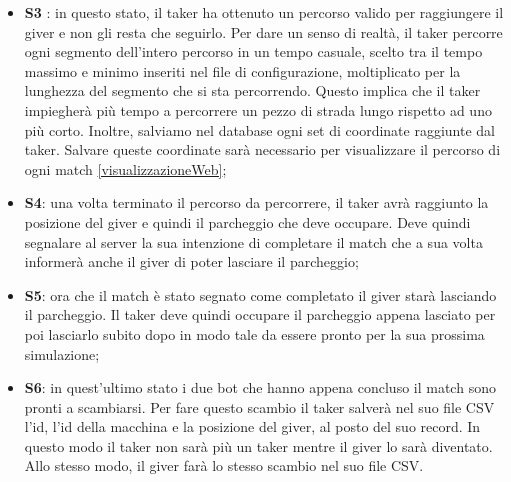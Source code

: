 \documentclass[main.tex]{subfiles}
\begin{document}
\begin{itemize}
    \item \textbf{S3} \label{follow-path}: in questo stato, il taker ha ottenuto un percorso valido per raggiungere il giver e non gli resta che seguirlo. Per dare un senso di realtà, il taker percorre ogni segmento dell'intero percorso in un tempo casuale, scelto tra il tempo massimo e minimo inseriti nel file di configurazione, moltiplicato per la lunghezza del segmento che si sta percorrendo. Questo implica che il taker impiegherà più tempo a percorrere un pezzo di strada lungo rispetto ad uno più corto.\newline
    Inoltre, salviamo nel database ogni set di coordinate raggiunte dal taker. Salvare queste coordinate sarà necessario per visualizzare il percorso di ogni match \ref{visualizzazioneWeb};
    
    


    \item \textbf{S4}: una volta terminato il percorso da percorrere, il taker avrà raggiunto la posizione del giver e quindi il parcheggio che deve occupare. Deve quindi segnalare al server la sua intenzione di completare il match che a sua volta informerà anche il giver di poter lasciare il parcheggio;

    

    \item \textbf{S5}: ora che il match è stato segnato come completato il giver starà lasciando il parcheggio. Il taker deve quindi occupare il parcheggio appena lasciato per poi lasciarlo subito dopo in modo tale da essere pronto per la sua prossima simulazione;

    
    
    \item \textbf{S6}: in quest'ultimo stato i due bot che hanno appena concluso il match sono pronti a scambiarsi. Per fare questo scambio il taker salverà nel suo file CSV l'id, l'id della macchina e la posizione del giver, al posto del suo record. In questo modo il taker non sarà più un taker mentre il giver lo sarà diventato. Allo stesso modo, il giver farà lo stesso scambio nel suo file CSV.

    
    
\end{itemize}
\end{document}
